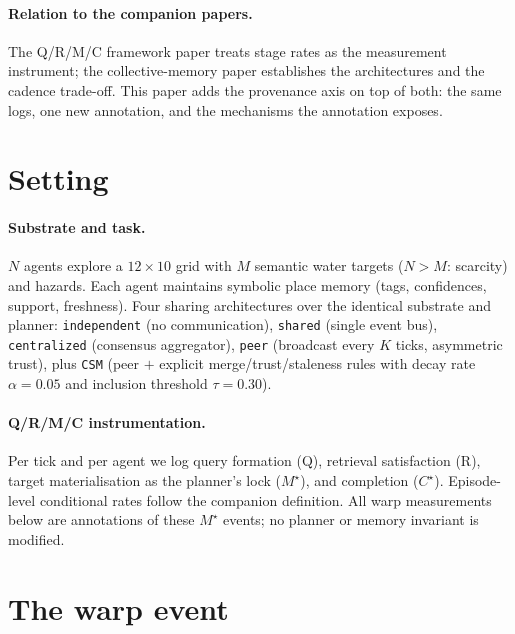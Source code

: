 \documentclass{article}
\newcommand{\method}[1]{\texttt{#1}}
\newcommand{\mstar}{M^{\star}}
\newcommand{\cstar}{C^{\star}}
\begin{document}
\paragraph{Relation to the companion papers.}
The Q/R/M/C framework paper treats stage rates as the measurement
instrument; the collective-memory paper establishes the architectures
and the cadence trade-off. This paper adds the provenance axis on top
of both: the same logs, one new annotation, and the mechanisms the
annotation exposes. %

\section{Setting}
\label{sec:setting}

\paragraph{Substrate and task.} $N$ agents explore a $12\times10$ grid
with $M$ semantic water targets ($N>M$: scarcity) and hazards. Each
agent maintains symbolic place memory (tags, confidences, support,
freshness). Four sharing architectures over the identical substrate
and planner: \method{independent} (no communication),
\method{shared} (single event bus), \method{centralized} (consensus
aggregator), \method{peer} (broadcast every $K$ ticks, asymmetric
trust), plus \method{CSM} (peer $+$ explicit merge/trust/staleness
rules with decay rate $\alpha{=}0.05$ and inclusion threshold
$\tau{=}0.30$). %

\paragraph{Q/R/M/C instrumentation.} Per tick and per agent we log
query formation (Q), retrieval satisfaction (R), target
materialisation as the planner's lock ($\mstar$), and completion
($\cstar$). Episode-level conditional rates follow the companion
definition. All warp measurements below are annotations of these
$\mstar$ events; no planner or memory invariant is modified.

\section{The warp event}
\label{sec:warp-def}
\end{document}
